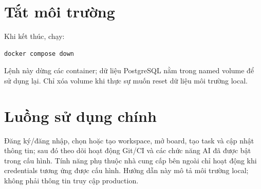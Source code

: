 \documentclass[12pt,a4paper]{report}
\begin{document}
\section{Tắt môi trường}
Khi kết thúc, chạy:
\begin{verbatim}
docker compose down
\end{verbatim}
Lệnh này dừng các container; dữ liệu PostgreSQL nằm trong named volume để sử dụng lại. Chỉ xóa volume khi thực sự muốn reset dữ liệu môi trường local.

\section{Luồng sử dụng chính}
Đăng ký/đăng nhập, chọn hoặc tạo workspace, mở board, tạo task và cập nhật thông tin; sau đó theo dõi hoạt động Git/CI và các chức năng AI đã được bật trong cấu hình. Tính năng phụ thuộc nhà cung cấp bên ngoài chỉ hoạt động khi credentials tương ứng được cấu hình. Hướng dẫn này mô tả môi trường local; không phải thông tin truy cập production.
\end{document}
